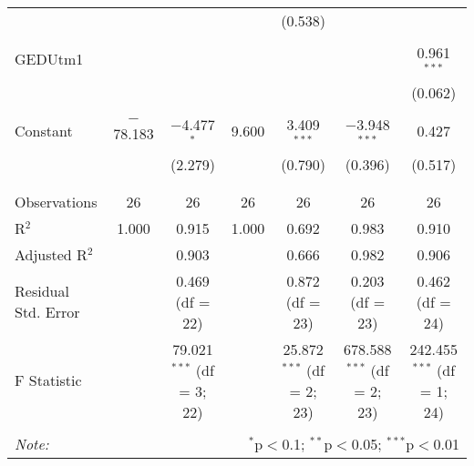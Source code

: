 \documentclass[openany]{memoir}
\begin{document}
\begin{landscape}
\begin{table}[!htbp]
\begin{tabular}{@{\extracolsep{5pt}}lcccccc}
  &  &  &  & (0.538) &  &  \\ 
  & & & & & & \\ 
 GEDUtm1 &  &  &  &  &  & 0.961$^{***}$ \\ 
  &  &  &  &  &  & (0.062) \\ 
  & & & & & & \\ 
 Constant & $-$78.183 & $-$4.477$^{*}$ & 9.600 & 3.409$^{***}$ & $-$3.948$^{***}$ & 0.427 \\ 
  &  & (2.279) &  & (0.790) & (0.396) & (0.517) \\ 
  & & & & & & \\ 
\hline \\[-1.8ex] 
Observations & 26 & 26 & 26 & 26 & 26 & 26 \\ 
R$^{2}$ & 1.000 & 0.915 & 1.000 & 0.692 & 0.983 & 0.910 \\ 
Adjusted R$^{2}$ &  & 0.903 &  & 0.666 & 0.982 & 0.906 \\ 
Residual Std. Error &  & 0.469 (df = 22) &  & 0.872 (df = 23) & 0.203 (df = 23) & 0.462 (df = 24) \\ 
F Statistic &  & 79.021$^{***}$ (df = 3; 22) &  & 25.872$^{***}$ (df = 2; 23) & 678.588$^{***}$ (df = 2; 23) & 242.455$^{***}$ (df = 1; 24) \\ 
\hline 
\hline \\[-1.8ex] 
\textit{Note:}  & \multicolumn{6}{r}{$^{*}$p$<$0.1; $^{**}$p$<$0.05; $^{***}$p$<$0.01} \\ 
\end{tabular} 
\end{table} 



\end{landscape}



\cleardoublepage
%








\end{document}
